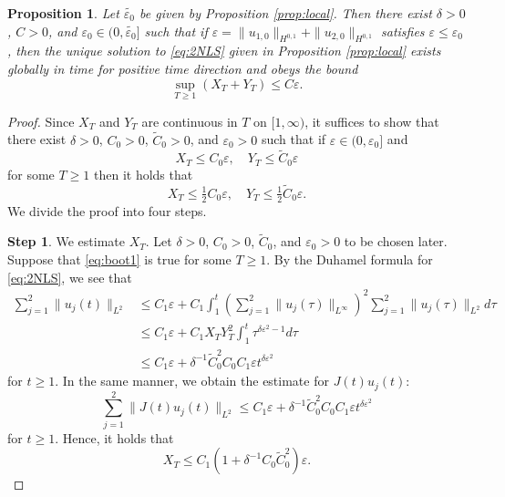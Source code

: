 \documentclass[11pt,a4paper,twosides]{amsart}
\theoremstyle{plain}
\newtheorem{proposition}[theorem]{Proposition}
\theoremstyle{remark}
\numberwithin{equation}{section}
\def\le{\leqslant}
\def\ge{\geqslant}
\theoremstyle{definition}
\newcommand{\1}{{\bf 1}_{\{|x| < |t|\}}}
\renewcommand{\epsilon}{\varepsilon}
\renewcommand{\tilde}{\widetilde}
\begin{document}
\begin{proposition}\label{prop:global}
Let $\widetilde{\epsilon_0}$ be given by Proposition 
\ref{prop:local}. 
Then there exist $\delta > 0$, $C > 0$, and $\epsilon_0 \in (0,\widetilde{\epsilon_0}]$ 
such that if $\epsilon= \|u_{1,0}\|_{H^{0,1}} + \|u_{2,0}\|_{H^{0,1}}$ 
satisfies $\epsilon\le\epsilon_0$, then the unique solution to \eqref{eq:2NLS} 
given in Proposition \ref{prop:local} exists globally 
in time for positive time direction and obeys the bound
  \begin{equation}
    \sup_{T \ge 1}\left(X_T + Y_T\right) \le C\epsilon.
  \end{equation}
\end{proposition}
\begin{proof}
Since $X_T$ and $Y_T$ are continuous in $T$ on $[1,\infty)$,
 it suffices to show that there exist $\delta > 0$, $C_0 > 0$, $\widetilde{C}_0 > 0$, and $\epsilon_0 > 0$ such that if
  $\epsilon \in (0,\epsilon_0]$ and 
  \begin{equation}\label{eq:boot1}
    X_T \le C_0\epsilon, \quad Y_T \le \widetilde{C}_0\epsilon
  \end{equation}
  for some $T \ge 1$ then it holds that
  \begin{equation}\label{eq:boot2}
    X_T \le \tfrac{1}{2}C_0\epsilon, \quad Y_T \le \tfrac{1}{2}\widetilde{C}_0\epsilon.
\end{equation}
We divide the proof into four steps.

{\bf Step 1}. We estimate $X_T$.
Let $\delta > 0$, $C_0 > 0$, $\tilde{C}_0$, and $\epsilon_0 > 0$ to be chosen later. Suppose that \eqref{eq:boot1} is true for some $T \ge 1$.
  By the Duhamel formula for \eqref{eq:2NLS}, we see that
  \begin{align*}
    \sum_{j=1}^2\|u_j(t)\|_{L^2}
     & \le C_1\epsilon + 
     C_1\int_1^t\left(\sum_{j=1}^2\|u_j(\tau)
     \|_{L^\infty}\right)^2\sum_{j=1}^2\|u_j(\tau)\|_{L^2}d\tau \\
     & \le C_1\epsilon + C_1X_TY_T^2\int_1^t \tau^{\delta\epsilon^2-1}
     d\tau                                            \\
     & \le C_1\epsilon + \delta^{-1}\widetilde{C}_0^2C_0C_1\epsilon t^{\delta\epsilon^2}
  \end{align*}
  for $t \ge 1$.
  In the same manner, we obtain the estimate for $J(t)u_j(t)$:
  \begin{equation}
    \sum_{j=1}^2\|J(t)u_j(t)\|_{L^2} \le C_1\epsilon 
    +\delta^{-1}\widetilde{C}_0^2C_0C_1 \epsilon t^{\delta\epsilon^2}
  \end{equation}
  for $t \ge 1$.
  Hence, it holds that
  \begin{equation}
    X_T \le C_1(1+\delta^{-1}C_0\widetilde{C}_0^2)\epsilon.
    \label{eq:XT1}
  \end{equation}
  

\end{proof}
\end{document}
